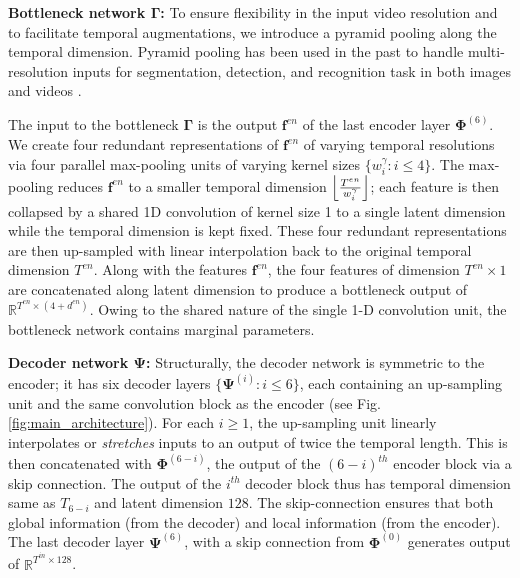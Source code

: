 \documentclass[10pt,twocolumn,letterpaper]{article}
\newcommand{\feat}{\mathbf{f}}
\newcommand{\enc}{\ensuremath{\mathbf{\Phi}}}
\newcommand{\dec}{\ensuremath{\mathbf{\Psi}}}
\newcommand{\bottle}{\ensuremath{\mathbf{\Gamma}}}
\newcommand{\tenc}{\ensuremath{T^{en}}}
\newcommand{\denc}{\ensuremath{d^{en}}}
\newcommand{\fenc}{\ensuremath{\feat^{en}}}
\DeclarePairedDelimiter\floor{\lfloor}{\rfloor}
\begin{document}
\textbf{Bottleneck network \bottle:} 
To ensure flexibility in the input video resolution and to facilitate temporal augmentations, we introduce a pyramid pooling \cite{spp_original}
along the temporal dimension. Pyramid pooling has been used in the past to handle multi-resolution inputs for segmentation, detection, and recognition task in both images and videos \cite{spatial-pp, temporal-pp, deeplab, deeplabv3, dac-spp-unet, zheng2019spatial}.

The input to the bottleneck \bottle{} is the output \fenc{} of the last encoder layer $\enc^{(6)}$.  We create four redundant representations of \fenc{} of varying temporal resolutions via 
four parallel max-pooling units of varying kernel sizes $\{w^{\gamma}_i: i\le 4\}$. The max-pooling reduces \fenc{} 
to a smaller temporal dimension $\floor*{\frac{\tenc}{w^{\gamma}_i}}$; each feature is then collapsed by a shared 1D convolution of kernel size 1 to a single latent dimension while the temporal dimension is kept fixed. 
These four redundant representations are then up-sampled with linear interpolation back to the original temporal dimension \tenc{}. Along with the features \fenc{}, the four features of dimension $\tenc{} \times 1$ are concatenated along latent dimension to produce a bottleneck output of $\mathbb{R}^{\tenc{} \times (4+\denc)}$. 
Owing to the shared nature of the single 1-D convolution unit, the bottleneck network contains marginal parameters.

\textbf{Decoder network \dec:} Structurally, the decoder network is symmetric to the encoder; it has six decoder layers $\{\dec^{(i)}: i\!\le\!6\}$, each containing an up-sampling unit and the same convolution block as the encoder (see Fig. \ref{fig:main_architecture}). 
For each $i\!\ge\!1$, the up-sampling unit linearly interpolates or \emph{stretches} inputs to an output of twice the temporal length.
This is then concatenated with $\enc^{(6-i)}$, \ie the output of the $(6-i)^{th}$ encoder block via a skip connection. 
The output of the $i^{th}$ decoder block thus has temporal dimension same as $T_{6-i}$ and latent dimension $128$. 
The skip-connection ensures that both global information (from the decoder) and local information (from the encoder).  The last decoder layer $\dec^{(6)}$, with a skip connection from $\enc^{(0)}$ generates output of $\mathbb{R} ^{T^{in}\times 128}$. 
\end{document}
